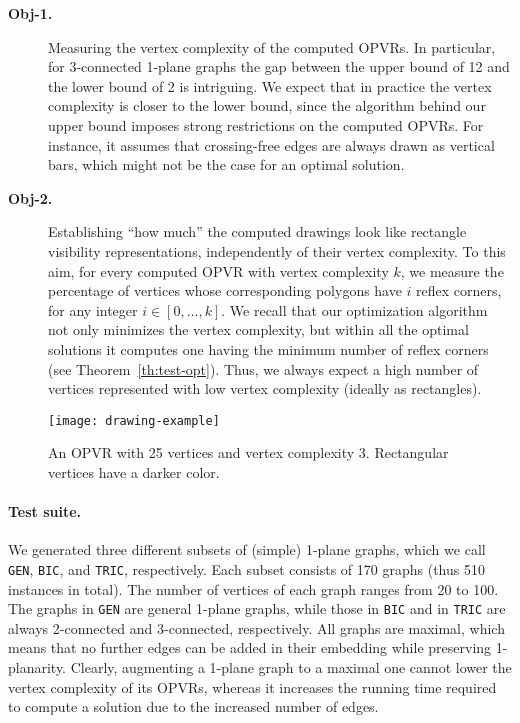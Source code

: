 \documentclass{article}
\newcommand{\opvr}{OPVR\xspace}
\begin{document}
\begin{description}
\item[\textbf{Obj-1.}]  Measuring the vertex complexity of the computed {\opvr}s. In particular, for 3-connected 1-plane graphs the gap between the upper bound of 12 and the lower bound of 2 is intriguing. We expect that in practice the vertex complexity is closer to the lower bound, since the algorithm behind our upper bound imposes strong restrictions on the computed {\opvr}s. For instance, it assumes that crossing-free edges are always drawn as vertical bars, which might not be the case for an optimal solution. 

\item[\textbf{Obj-2.}] Establishing ``how much'' the computed drawings look like rectangle visibility representations, independently of their vertex complexity. To this aim, for every computed \opvr with vertex complexity $k$, we measure the percentage of vertices whose corresponding polygons have $i$ reflex corners, for any integer $i \in [0, \dots, k]$. We recall that our optimization algorithm not only minimizes the vertex complexity, but within all the optimal solutions it computes one having the minimum number of reflex corners (see Theorem~\ref{th:test-opt}). Thus, we always expect a high number of vertices represented with low vertex complexity (ideally as rectangles).
\end{description} 

\begin{figure}[tb]
 \centering
 \texttt{[image: drawing-example]}
 \caption{An \opvr with 25 vertices and vertex complexity 3. Rectangular vertices have a darker color.}\label{fi:drawing-example}
\end{figure}

\paragraph{Test suite.}
We generated three different subsets of (simple) 1-plane graphs, which we call {\tt GEN}, {\tt BIC}, and {\tt TRIC}, respectively. Each subset consists of 170 graphs (thus 510 instances in total). The number of vertices of each graph ranges from 20 to 100. The graphs in {\tt GEN} are general 1-plane graphs, while those in {\tt BIC} and in {\tt TRIC} are always 2-connected and 3-connected, respectively. All graphs are maximal, which means that no further edges can be added in their embedding while preserving 1-planarity. Clearly, augmenting a 1-plane graph to a maximal one cannot lower the vertex complexity of its {\opvr}s, whereas it increases the running time required to compute a solution due to the increased number of edges. 
\end{document}
